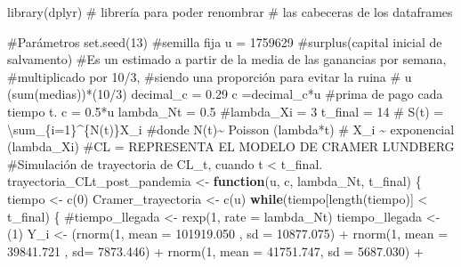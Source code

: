 \documentclass[
  us-letterpaper,
]{scrreprt}
\newenvironment{Shaded}{\begin{snugshade}}{\end{snugshade}}
\newcommand{\AttributeTok}[1]{\textcolor[rgb]{0.40,0.45,0.13}{#1}}
\newcommand{\CommentTok}[1]{\textcolor[rgb]{0.37,0.37,0.37}{#1}}
\newcommand{\ControlFlowTok}[1]{\textcolor[rgb]{0.00,0.23,0.31}{\textbf{#1}}}
\newcommand{\DecValTok}[1]{\textcolor[rgb]{0.68,0.00,0.00}{#1}}
\newcommand{\FloatTok}[1]{\textcolor[rgb]{0.68,0.00,0.00}{#1}}
\newcommand{\FunctionTok}[1]{\textcolor[rgb]{0.28,0.35,0.67}{#1}}
\newcommand{\NormalTok}[1]{\textcolor[rgb]{0.00,0.23,0.31}{#1}}
\newcommand{\OtherTok}[1]{\textcolor[rgb]{0.00,0.23,0.31}{#1}}
\newcommand{\SpecialCharTok}[1]{\textcolor[rgb]{0.37,0.37,0.37}{#1}}
\theoremstyle{plain}
\theoremstyle{plain}
\theoremstyle{definition}
\theoremstyle{remark}
\begin{document}
\begin{Shaded}
\begin{Highlighting}[]
\FunctionTok{library}\NormalTok{(dplyr) }\CommentTok{\# librería para poder renombrar }
\CommentTok{\# las cabeceras de los dataframes}

\CommentTok{\#Parámetros}
\FunctionTok{set.seed}\NormalTok{(}\DecValTok{13}\NormalTok{) }\CommentTok{\#semilla fija}
\NormalTok{u }\OtherTok{=} \DecValTok{1759629} \CommentTok{\#surplus(capital inicial de salvamento)}
\CommentTok{\#Es un estimado a partir de la media de las ganancias por semana, }
\CommentTok{\#multiplicado por 10/3, }
\CommentTok{\#siendo una proporción para evitar la ruina}
\CommentTok{\# u (sum(medias))*(10/3)}
\NormalTok{decimal\_c }\OtherTok{=} \FloatTok{0.29}
\NormalTok{c }\OtherTok{=}\NormalTok{decimal\_c}\SpecialCharTok{*}\NormalTok{u }\CommentTok{\#prima de pago cada tiempo t. c = 0.5*u}
\NormalTok{lambda\_Nt }\OtherTok{=} \FloatTok{0.5}
\CommentTok{\#lambda\_Xi = 3}
\NormalTok{t\_final }\OtherTok{=} \DecValTok{14}
\CommentTok{\# S(t) = \textbackslash{}sum\_\{i=1\}\^{}\{N(t)\}X\_i}
\CommentTok{\#donde N(t)\textasciitilde{} Poisson (lambda*t)}
\CommentTok{\# X\_i \textasciitilde{} exponencial (lambda\_Xi)}
\CommentTok{\#CL = REPRESENTA EL MODELO DE CRAMER LUNDBERG}
\CommentTok{\#Simulación de trayectoria de CL\_t, cuando t \textless{} t\_final.}
\NormalTok{trayectoria\_CLt\_post\_pandemia }\OtherTok{\textless{}{-}} \ControlFlowTok{function}\NormalTok{(u, c, lambda\_Nt, t\_final)}
\NormalTok{\{}
\NormalTok{  tiempo }\OtherTok{\textless{}{-}} \FunctionTok{c}\NormalTok{(}\DecValTok{0}\NormalTok{)}
\NormalTok{  Cramer\_trayectoria }\OtherTok{\textless{}{-}} \FunctionTok{c}\NormalTok{(u)}
  \ControlFlowTok{while}\NormalTok{(tiempo[}\FunctionTok{length}\NormalTok{(tiempo)] }\SpecialCharTok{\textless{}}\NormalTok{ t\_final)}
\NormalTok{  \{}
    \CommentTok{\#tiempo\_llegada \textless{}{-} rexp(1, rate = lambda\_Nt)}
\NormalTok{    tiempo\_llegada }\OtherTok{\textless{}{-}}\NormalTok{ (}\DecValTok{1}\NormalTok{)}
\NormalTok{    Y\_i }\OtherTok{\textless{}{-}}\NormalTok{  (}\FunctionTok{rnorm}\NormalTok{(}\DecValTok{1}\NormalTok{, }\AttributeTok{mean =} \FloatTok{101919.050}\NormalTok{ , }\AttributeTok{sd =} \FloatTok{10877.075}\NormalTok{) }\SpecialCharTok{+} 
              \FunctionTok{rnorm}\NormalTok{(}\DecValTok{1}\NormalTok{, }\AttributeTok{mean =}  \FloatTok{39841.721}\NormalTok{ , }\AttributeTok{sd=} \FloatTok{7873.446}\NormalTok{)  }\SpecialCharTok{+}  
              \FunctionTok{rnorm}\NormalTok{(}\DecValTok{1}\NormalTok{, }\AttributeTok{mean =}   \FloatTok{41751.747}\NormalTok{, }\AttributeTok{sd =} \FloatTok{5687.030}\NormalTok{) }\SpecialCharTok{+} 

\end{Highlighting}
\end{Shaded}
\end{document}
